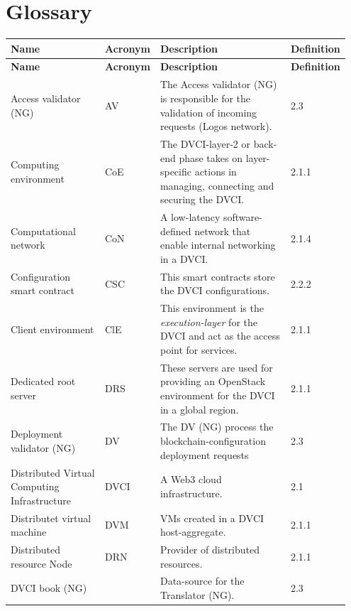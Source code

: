 \documentclass[]{article}
\begin{document}
\section*{Glossary}
\begin{longtable}{p{0.3\linewidth} p{0.1\linewidth} p{0.45\linewidth} p{0.1\linewidth}}
	\textbf{Name}&\textbf{Acronym}&\textbf{Description}&\textbf{Definition}\newline \\ \hline
	\endfirsthead
	\textbf{Name}&\textbf{Acronym}&\textbf{Description}&\textbf{Definition}\newline \\ \hline
	\endhead

Access validator (NG) & AV & The Access validator (NG) is responsible for the validation of incoming requests (Logos network). & 2.3 \\ %
Computing environment & CoE & The DVCI-layer-2 or back-end phase takes on layer-specific actions in managing, connecting and securing the DVCI. & 2.1.1 \\ %
Computational network & CoN & A low-latency software-defined network that enable internal networking in a DVCI. & 2.1.4 \\ %
Configuration smart contract & CSC & This smart contracts store the DVCI configurations. & 2.2.2 \\ %
Client environment & ClE & This environment is the \textit{execution-layer} for the DVCI and act as the access point for services. & 2.1.1 \\ %
Dedicated root server & DRS & These servers are used for providing an OpenStack environment for the DVCI in a global region. & 2.1.1 \\ %
Deployment validator (NG) & DV & The DV (NG) process the blockchain-configuration deployment requests & 2.3 \\ %
Distributed Virtual \newline Computing Infrastructure & DVCI & A Web3 cloud infrastructure. & 2.1 \\ %
Distributet virtual machine & DVM & VMs created in a DVCI host-aggregate. & 2.1.1 \\ %
Distributed resource Node & DRN & Provider of distributed resources.  & 2.1.1 \\ %
DVCI book (NG) & & Data-source for the Translator (NG). & 2.3 \\ %

\end{longtable}
\end{document}
